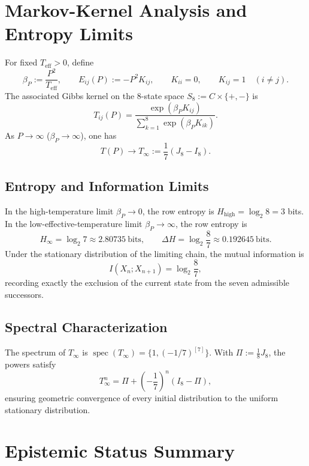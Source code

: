 \documentclass[11pt,a4paper]{article}
\begin{document}
\section{Markov-Kernel Analysis and Entropy Limits}

For fixed \(T_{\mathrm{eff}}>0\), define
\[
\beta_P:=\frac{P^2}{T_{\mathrm{eff}}},
\qquad
E_{ij}(P):=-P^2K_{ij},
\qquad
K_{ii}=0,
\qquad
K_{ij}=1 \quad (i\ne j).
\]
The associated Gibbs kernel on the 8-state space \(S_8 := C \times \{+,-\}\) is
\[
T_{ij}(P)
=
\frac{\exp(\beta_PK_{ij})}
     {\sum_{k=1}^8\exp(\beta_PK_{ik})}.
\]
As \(P\to\infty\) (\(\beta_P\to\infty\)), one has
\[
T(P)\longrightarrow
T_\infty
:=
\frac17(J_8-I_8).
\]

\subsection{Entropy and Information Limits}
In the high-temperature limit \(\beta_P\to0\), the row entropy is \(H_{\mathrm{high}} = \log_2 8 = 3\) bits. In the low-effective-temperature limit \(\beta_P\to\infty\), the row entropy is
\[
H_\infty
=
\log_2 7
\approx
2.80735\ \mathrm{bits},
\qquad
\Delta H = \log_2\frac87
\approx
0.192645\ \mathrm{bits}.
\]
Under the stationary distribution of the limiting chain, the mutual information is
\[
I(X_n;X_{n+1}) = \log_2\frac87,
\]
recording exactly the exclusion of the current state from the seven admissible successors.

\subsection{Spectral Characterization}
The spectrum of \(T_\infty\) is \(\operatorname{spec}(T_\infty) = \{1, (-1/7)^{[7]}\}\). With \(\Pi:=\frac18 J_8\), the powers satisfy
\[
T_\infty^n
=
\Pi+
\left(-\frac17\right)^n(I_8-\Pi),
\]
ensuring geometric convergence of every initial distribution to the uniform stationary distribution.

\section{Epistemic Status Summary}
\end{document}
